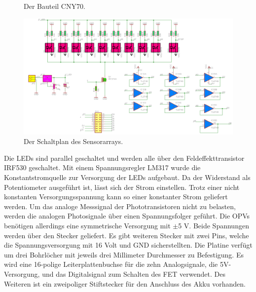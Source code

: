 \documentclass[a4paper,bibtotoc,oneside]{scrbook}
\begin{document}
\begin{figure}
\centering
\caption{Der Bauteil CNY70.} \label{cny}
\end{figure} 

\begin{figure}[htbp]
\centering
\includegraphics[width=125mm]{img/array.png}
\caption{Der Schaltplan des Sensorarrays.}\label{array}
\end{figure}

\noindent Die LEDs sind parallel geschaltet und werden alle über den Feldeffekttransistor IRF530 \cite{irf} geschaltet.
Mit einem Spannungsregler LM317 wurde die Konstantstromquelle zur Versorgung der LEDs aufgebaut. Da der Widerstand als Potentiometer ausgeführt ist, lässt sich der Strom einstellen. Trotz einer nicht konstanten Versorgungsspannung kann so einer konstanter Strom geliefert werden. Um das analoge Messsignal der Phototransistoren nicht zu belasten, werden die analogen Photosignale über einen Spannungsfolger geführt. Die OPVs benötigen allerdings eine symmetrische Versorgung mit $\pm$5 V. Beide Spannungen werden über den Stecker geliefert.
Es gibt weiteren Stecker mit zwei Pins, welche die Spannungsversorgung mit 16 Volt und GND sicherstellten. 
Die Platine verfügt um drei Bohrlöcher mit jeweils drei Millimeter Durchmesser zu Befestigung.
Es wird eine 16-polige Leiterplattenbuchse für die zehn Analogsignale, die 5V-Versorgung, und das Digitalsignal zum Schalten des FET verwendet. Des Weiteren ist ein zweipoliger Stiftstecker für den Anschluss des Akku vorhanden.
\end{document}
